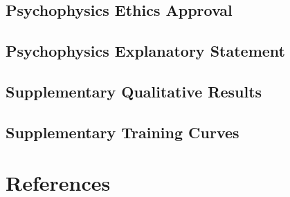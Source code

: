 \documentclass[a4paper,11pt,openany]{book}
\begin{document}
\begin{appendices}
\begin{small}
\begin{verbatim}
\end{verbatim}
\end{small}

\chapter{Psychophysics Ethics Approval}
\label{sec:org53c535b}
\chapter{Psychophysics Explanatory Statement}
\label{sec:org1301812}
\chapter{Supplementary Qualitative Results}
\label{sec:orgaa57c0d}
\chapter{Supplementary Training Curves}
\label{sec:org5894d6c}
\part{References}
\label{sec:orgf1329ba}


\end{appendices}
\end{document}
